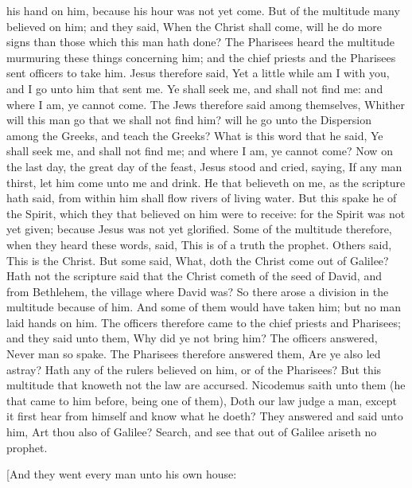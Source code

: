 his hand on him, because his hour was not yet come. But of the multitude many believed on him; and they said, When the Christ shall come, will he do more signs than those which this man hath done? The Pharisees heard the multitude murmuring these things concerning him; and the chief priests and the Pharisees sent officers to take him. Jesus therefore said, Yet a little while am I with you, and I go unto him that sent me. Ye shall seek me, and shall not find me: and where I am, ye cannot come. The Jews therefore said among themselves, Whither will this man go that we shall not find him? will he go unto the Dispersion among the Greeks, and teach the Greeks? What is this word that he said, Ye shall seek me, and shall not find me; and where I am, ye cannot come?  Now on the last day, the great day of the feast, Jesus stood and cried, saying, If any man thirst, let him come unto me and drink. He that believeth on me, as the scripture hath said, from within him shall flow rivers of living water. But this spake he of the Spirit, which they that believed on him were to receive: for the Spirit was not yet given; because Jesus was not yet glorified. Some of the multitude therefore, when they heard these words, said, This is of a truth the prophet. Others said, This is the Christ. But some said, What, doth the Christ come out of Galilee? Hath not the scripture said that the Christ cometh of the seed of David, and from Bethlehem, the village where David was? So there arose a division in the multitude because of him. And some of them would have taken him; but no man laid hands on him.  The officers therefore came to the chief priests and Pharisees; and they said unto them, Why did ye not bring him? The officers answered, Never man so spake. The Pharisees therefore answered them, Are ye also led astray? Hath any of the rulers believed on him, or of the Pharisees? But this multitude that knoweth not the law are accursed. Nicodemus saith unto them (he that came to him before, being one of them), Doth our law judge a man, except it first hear from himself and know what he doeth? They answered and said unto him, Art thou also of Galilee? Search, and see that out of Galilee ariseth no prophet.  

[And they went every man unto his own house: 

